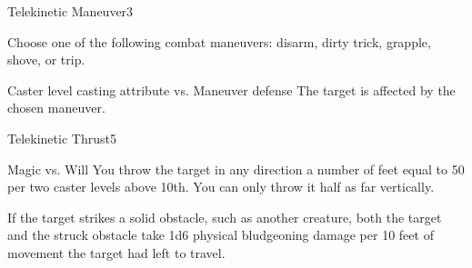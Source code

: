 \begin{spellfooter}
\begin{spellsection}{Telekinetic Maneuver}{3}
    \begin{spellheader}
    \end{spellheader}
    \begin{spellcontent}
        \begin{spelltargetinginfo}
        \end{spelltargetinginfo}
        \begin{spelleffects}
            \spellspecial Choose one of the following combat maneuvers: disarm, dirty trick, grapple, shove, or trip.
            \begin{spellattack}{Caster level \add casting attribute vs. Maneuver defense}
                \spellsuccess The target is affected by the chosen maneuver.
            \end{spellattack}
        \end{spelleffects}
    \end{spellcontent}
    \begin{spellfooter}
    \end{spellfooter}
\end{spellsection}

\begin{spellsection}{Telekinetic Thrust}{5}
    \begin{spellheader}
        \begin{spelltargetinginfo}
        \end{spelltargetinginfo}
    \end{spellheader}
    \begin{spellcontent}
        \begin{spelleffects}
            \begin{spellattack}{Magic vs. Will}
                \spellsuccess You throw the target in any direction a number of feet equal to 50  per two caster levels above 10th. You can only throw it half as far vertically.

                If the target strikes a solid obstacle, such as another creature, both the target and the struck obstacle take 1d6 physical bludgeoning damage per 10 feet of movement the target had left to travel.
            \end{spellattack}
        \end{spelleffects}
    \end{spellcontent}
    \begin{spellfooter}
    \end{spellfooter}
\end{spellsection}



\end{spellfooter}
